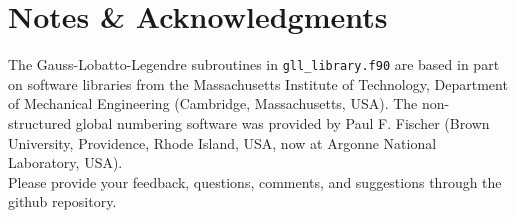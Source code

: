
\chapter*{Notes \& Acknowledgments}


The Gauss-Lobatto-Legendre subroutines in \texttt{gll\_library.f90}
are based in part on software libraries from the Massachusetts Institute
of Technology, Department of Mechanical Engineering (Cambridge, Massachusetts, USA).
The non-structured global numbering software was provided by Paul
F. Fischer (Brown University, Providence, Rhode Island, USA, now at Argonne National Laboratory, USA).\\

Please provide your feedback, questions, comments, and suggestions through the github repository.

